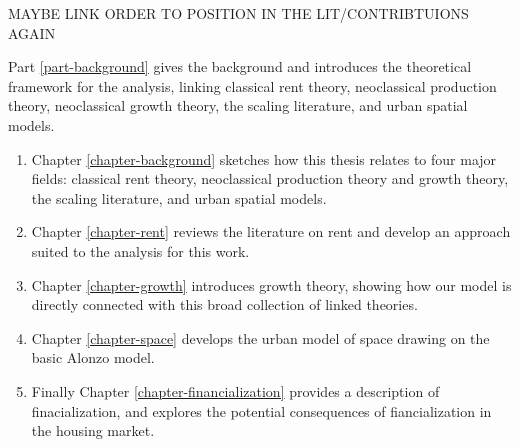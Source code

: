 MAYBE LINK ORDER TO POSITION IN THE LIT/CONTRIBTUIONS AGAIN %

Part \ref{part-background} gives the background and introduces the theoretical framework for the analysis,  linking classical rent theory, neoclassical production theory, neoclassical growth theory, the scaling literature, and urban spatial models. 

\begin{enumerate}
    \item Chapter \ref{chapter-background} sketches how this thesis relates to four major fields: classical rent theory, neoclassical production theory and growth theory, the scaling literature, and urban spatial models. %
    \item Chapter \ref{chapter-rent} reviews the literature on rent and develop an approach suited to the analysis for this work.
    \item Chapter \ref{chapter-growth} introduces growth theory, showing how our model is directly connected with this broad collection of linked theories. %
    \item Chapter \ref{chapter-space} develops the urban model of space drawing on the basic Alonzo model.
    \item Finally Chapter \ref{chapter-financialization} provides a description of finacialization, and explores the potential consequences of fiancialization in the housing market.  %
\end{enumerate}
 
